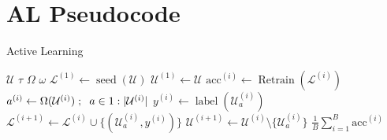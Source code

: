 \documentclass[]{article}
\begin{document}
\section{AL Pseudocode}
\begin{algorithm}[H]
	\caption{Active Learning}\label{alg:active_learning}
	\begin{algorithmic}[1]
		\Require $\mathcal{U}$ 
		\Require $\tau$ 
		\Require $\Omega$ 
		\Require $\omega$ 
		\State $\mathcal{L}^{(1)} \gets \operatorname{seed}(\mathcal{U})$  
		\State $\mathcal{U}^{(1)} \gets \mathcal{U}$
		\State $\text{acc}^{(i)} \gets \operatorname{Retrain}(\mathcal{L}^{(i)})$  %
		\State $a^{(i)} \gets \Omega(\mathcal{U}^{(i)}) \hspace{1mm};\hspace{2mm} a \in 1:|\mathcal{U}^{(i)}|$ 
		\State $y^{(i)} \gets \operatorname{label}(\mathcal{U}^{(i)}_{a})$ 
		\State $\mathcal{L}^{(i+1)} \gets \mathcal{L}^{(i)} \cup \{(\mathcal{U}^{(i)}_a, y^{(i)})\}$
		\State $\mathcal{U}^{(i+1)} \gets \mathcal{U}^{(i)} \setminus \{\mathcal{U}^{(i)}_a\}$
		\EndFor
		\State
		\Return $\frac{1}{B} \sum_{i=1}^{B} \text{acc}^{(i)}$
	\end{algorithmic}
\end{algorithm}
\end{document}
